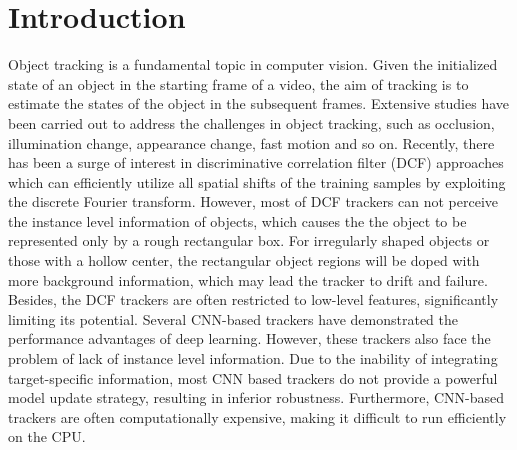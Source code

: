 \documentclass[review]{elsarticle}
\begin{document}
\section{Introduction}
Object tracking is a fundamental topic in computer vision. Given the initialized state of an object in the starting frame of a video, the aim of tracking is to estimate the states of the object in the subsequent frames. Extensive studies \cite{Bolme2010VisualOT, Danelljan2014AccurateSE, Henriques2015HighSpeedTW, Li2014ASA, Nam2016LearningMC, Danelljan2015ConvolutionalFF, Wang2018SiamMask} have been carried out to address the challenges in object tracking, such as occlusion, illumination change, appearance change, fast motion and so on. Recently, there has been a surge of interest in discriminative correlation filter (DCF) approaches \cite{Bolme2010VisualOT, Danelljan2014AccurateSE, Henriques2015HighSpeedTW, Li2014ASA} which can efficiently utilize all spatial shifts of the training samples by exploiting the discrete Fourier transform. However, most of DCF trackers can not perceive the instance level information of objects, which causes the the object to be represented only by a rough rectangular box. For irregularly shaped objects or those with a hollow center, the rectangular object regions will be doped with more background information, which may lead the tracker to drift and failure. Besides, the DCF trackers are often restricted to low-level features, significantly limiting its potential. Several CNN-based trackers \cite{Nam2016LearningMC, Danelljan2015ConvolutionalFF} have demonstrated the performance advantages of deep learning. However, these trackers also face the problem of lack of instance level information. Due to the inability of integrating target-specific information, most CNN based trackers do not provide a powerful model update strategy, resulting in inferior robustness. Furthermore, CNN-based trackers are often computationally expensive, making it difficult to run efficiently on the CPU. 
\end{document}
